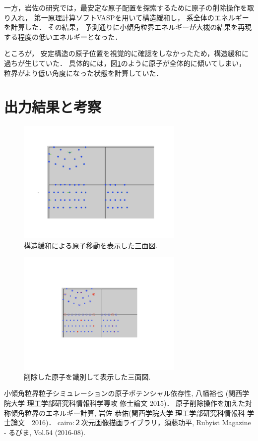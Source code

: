 \documentclass[a4j,twocolumn]{jsarticle}
\begin{document}
一方，岩佐の研究では，最安定な原子配置を探索するために原子の削除操作を取り入れ，
第一原理計算ソフトVASPを用いて構造緩和し，
系全体のエネルギーを計算した．
その結果，
予測通りに小傾角粒界エネルギーが大槻の結果を再現する程度の低いエネルギーとなった\cite{iwasa}．

ところが，
安定構造の原子位置を視覚的に確認をしなかったため，構造緩和に過ちが生じていた．
具体的には，図\ref{fig:two}のように原子が全体的に傾いてしまい，
粒界がより低い角度になった状態を計算していた．

\section{出力結果と考察}

\begin{figure}[h]
\begin{center}
   \includegraphics[width=80mm]{change_position.jpeg} 
     \caption{構造緩和による原子移動を表示した三面図.}
  \label{fig:two}
\end{center}
\end{figure}


\begin{figure}[h]
\begin{center}
   \includegraphics[width=80mm]{open_circle.jpeg} 
     \caption{削除した原子を識別して表示した三面図.}
  \label{fig:three}
\end{center}
\end{figure}

\begin{thebibliography}{9}
 小傾角粒界粒子シミュレーションの原子ポテンシャル依存性, 八幡裕也 (関西学院大学 理工学部研究科情報科学専攻 修士論文 2015)．
 原子削除操作を加えた対称傾角粒界のエネルギー計算, 岩佐 恭佑(関西学院大学 理工学部研究科情報科 学士論文　2016)． 
 cairo:２次元画像描画ライブラリ，須藤功平, Rubyist Magazine - るびま, Vol.54 (2016-08).
\end{thebibliography}
\end{document}
